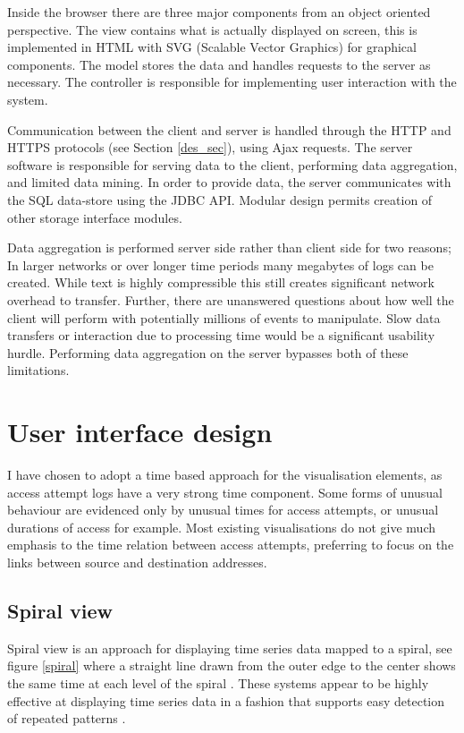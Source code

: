 Inside the browser there are three major components from an object oriented perspective. The view contains what is actually displayed on screen, this is implemented in HTML with SVG (Scalable Vector Graphics) for graphical components. The model stores the data and handles requests to the server as necessary. The controller is responsible for implementing user interaction with the system.

Communication between the client and server is handled through the HTTP and HTTPS protocols (see Section \ref{des_sec}), using Ajax requests.  The server software is responsible for serving data to the client, performing data aggregation, and limited data mining. In order to provide data, the server communicates with the SQL data-store using the JDBC API. Modular design permits creation of other storage interface modules. 

Data aggregation is performed server side rather than client side for two reasons; In larger networks or over longer time periods many megabytes of logs can be created. While text is highly compressible this still creates significant network overhead to transfer. Further, there are unanswered questions about how well the client will perform with potentially millions of events to manipulate. Slow data transfers or interaction due to processing time would be a significant usability hurdle. Performing data aggregation on the server bypasses both of these limitations. 

\section{User interface design}\label{screen_design} 
  
I have chosen to adopt a time based approach for the visualisation elements, as access attempt logs have a very strong time component. Some forms of unusual behaviour are evidenced only by unusual times for access attempts, or unusual durations of access for example. Most existing visualisations do not give much emphasis to the time relation between access attempts, preferring to focus on the links between source and destination addresses. 

\subsection{Spiral view}

Spiral view is an approach for displaying time series data mapped to a spiral, see figure \ref{spiral} where a straight line drawn from the outer edge to the center shows the same time at each level of the spiral \cite{bertini2007spiralview, chin2009visual}. These systems appear to be highly effective at displaying time series data in a fashion that supports easy detection of repeated patterns \cite{bertini2007spiralview, chin2009visual}. 

